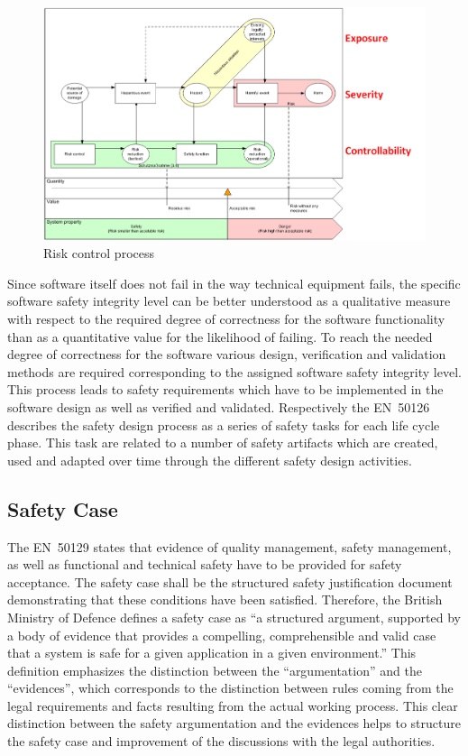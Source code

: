 \documentclass{template/openetcs_report}
\begin{document}
\begin{figure}[htbp]
\centering
\includegraphics[width=0.9\linewidth]{bld_2013-06-19_Risk-control-modell_1-0_jw}
\caption{Risk control process \cite{Schnieder.2013}}
\label{fig:Risk-control-modell-eng}
\end{figure}

Since software itself does not fail in the way technical equipment fails, the specific software safety integrity level can be better understood as a qualitative measure with respect to the required degree of correctness for the software functionality than as a quantitative value for the likelihood of failing. To reach the needed degree of correctness for the software various design, verification and validation methods are required corresponding to the assigned software safety integrity level. This process leads to safety requirements which have to be implemented in the software design as well as verified and validated. Respectively the EN~50126 describes the safety design process as a series of safety tasks for each life cycle phase. This task are related to a number of safety artifacts which are created, used and adapted over time through the different safety design activities.

\subsection{Safety Case}

The EN~50129 states that evidence of quality management, safety management, as well as functional and technical safety have to be provided for safety acceptance. The safety case shall be the structured safety justification document demonstrating that these conditions have been satisfied.
Therefore, the British Ministry of Defence defines a safety case as “a structured argument, supported by a body of evidence that provides a compelling, comprehensible and valid case that a system is safe for a given application in a given environment.”\cite{MinistryofDefence.2007} This definition emphasizes the distinction between the “argumentation” and the “evidences”, which corresponds to the distinction between rules coming from the legal requirements and facts resulting from the actual working process. This clear distinction between the safety argumentation and the evidences helps to structure the safety case and improvement of the discussions with the legal authorities.\cite{Muller.2010}
\end{document}

